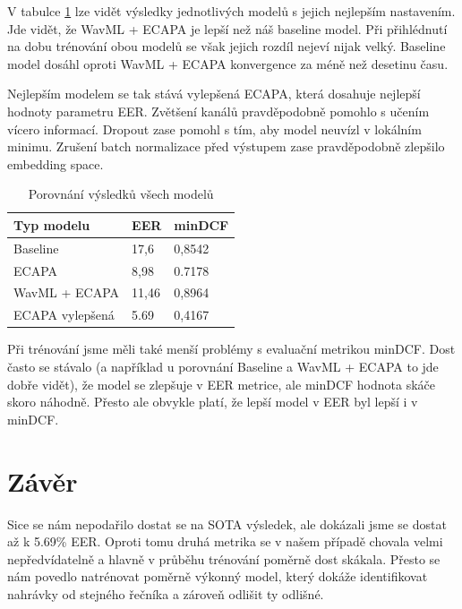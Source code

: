 \documentclass{article}
\begin{document}
V tabulce \ref{model_results} lze vidět výsledky jednotlivých modelů s jejich nejlepším nastavením. Jde vidět, že WavML + ECAPA je lepší než náš baseline model. Při přihlédnutí na dobu trénování obou modelů se však jejich rozdíl nejeví nijak velký. Baseline model dosáhl oproti WavML + ECAPA konvergence za méně než desetinu času.

Nejlepším modelem se tak stává vylepšená ECAPA, která dosahuje nejlepší hodnoty parametru EER. Zvětšení kanálů pravděpodobně pomohlo s učením vícero informací. Dropout zase pomohl s tím, aby model neuvízl v lokálním minimu. Zrušení batch normalizace před výstupem zase pravděpodobně zlepšilo embedding space.

\begin{table}[h]
\centering
\begin{tabular}{|l|l|l|}
\hline
Typ modelu          & EER   & minDCF \\ \hline
Baseline            & 17,6  & 0,8542 \\ \hline
ECAPA               & 8,98  & 0.7178 \\ \hline
WavML + ECAPA & 11,46 & 0,8964 \\ \hline
ECAPA vylepšená     & 5.69  & 0,4167 \\ \hline
\end{tabular}
\caption{Porovnání výsledků všech modelů}
\label{model_results}
\end{table}

Při trénování jsme měli také menší problémy s evaluační metrikou minDCF. Dost často se stávalo (a například u porovnání Baseline a WavML + ECAPA to jde dobře vidět), že model se zlepšuje v EER metrice, ale minDCF hodnota skáče skoro náhodně. Přesto ale obvykle platí, že lepší model v EER byl lepší i v minDCF.

\section{Závěr}
Sice se nám nepodařilo dostat se na SOTA výsledek, ale dokázali jsme se dostat až k 5.69\% EER. Oproti tomu druhá metrika se v našem případě chovala velmi nepředvídatelně a hlavně v průběhu trénování poměrně dost skákala. Přesto se nám povedlo natrénovat poměrně výkonný model, který dokáže identifikovat nahrávky od stejného řečníka a zároveň odlišit ty odlišné.

\newpage


\end{document}
